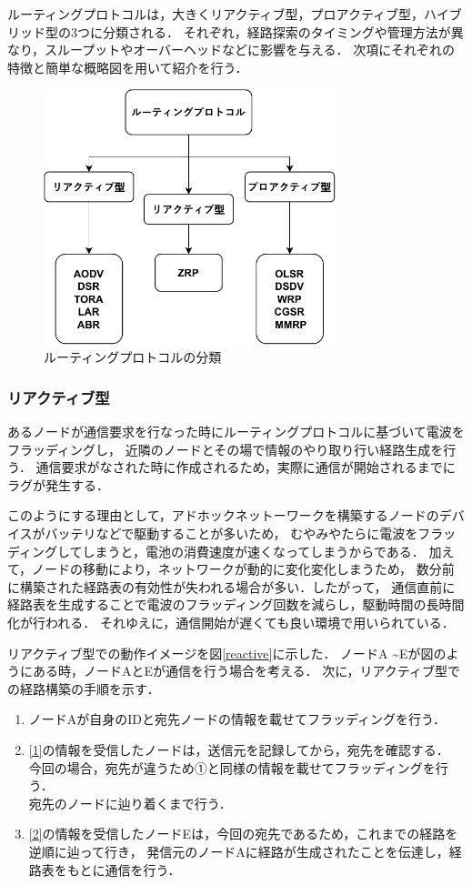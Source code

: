 \documentclass[a4paper, 11pt]{ltjsarticle}
\begin{document}
ルーティングプロトコルは，大きくリアクティブ型，プロアクティブ型，ハイブリッド型の3つに分類される．
それぞれ，経路探索のタイミングや管理方法が異なり，スループットやオーバーヘッドなどに影響を与える．
次項にそれぞれの特徴と簡単な概略図を用いて紹介を行う．
\begin{figure}[H]
  \centering
  \includegraphics[width=85mm]{classification_of_routing.pdf}
  \caption{ルーティングプロトコルの分類}
  \label{routing_classification}
\end{figure}

\clearpage
\subsubsection{リアクティブ型}
あるノードが通信要求を行なった時にルーティングプロトコルに基づいて電波をフラッディングし，
近隣のノードとその場で情報のやり取り行い経路生成を行う．
通信要求がなされた時に作成されるため，実際に通信が開始されるまでにラグが発生する．

このようにする理由として，アドホックネットーワークを構築するノードのデバイスがバッテリなどで駆動することが多いため，
むやみやたらに電波をフラッディングしてしまうと，電池の消費速度が速くなってしまうからである．
加えて，ノードの移動により，ネットワークが動的に変化変化しまうため，
数分前に構築された経路表の有効性が失われる場合が多い．したがって，
通信直前に経路表を生成することで電波のフラッディング回数を減らし，駆動時間の長時間化が行われる．
それゆえに，通信開始が遅くても良い環境で用いられている．

リアクティブ型での動作イメージを図\ref{reactive}に示した．
ノードA \textasciitilde Eが図のようにある時，ノードAとEが通信を行う場合を考える．
次に，リアクティブ型での経路構築の手順を示す．

\begin{enumerate}[label=\ding{\numexpr171+\arabic*}]
  \item \label{1} ノードAが自身のIDと宛先ノードの情報を載せてフラッディングを行う．
  \item \label{2} \ref{1}の情報を受信したノードは，送信元を記録してから，宛先を確認する．
  今回の場合，宛先が違うため①と同様の情報を載せてフラッディングを行う．\\
  宛先のノードに辿り着くまで行う．
  \item \label{3} \ref{2}の情報を受信したノードEは，今回の宛先であるため，これまでの経路を逆順に辿って行き，
  発信元のノードAに経路が生成されたことを伝達し，経路表をもとに通信を行う．
\end{enumerate}
\end{document}
